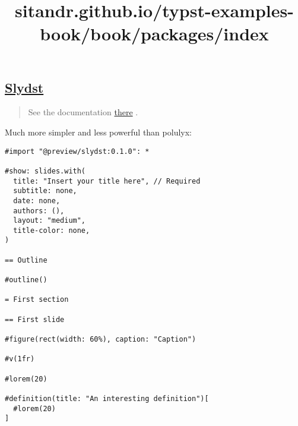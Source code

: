 \pandocbounded{}

\pandocbounded{}

\subsection{\texorpdfstring{\hyperref[slydst]{Slydst}}{Slydst}}\label{slydst}

\begin{quote}
See the documentation
\href{https://github.com/glambrechts/slydst?ysclid=lr2gszrkck541184604}{there}
.
\end{quote}

Much more simpler and less powerful than polulyx:

\begin{verbatim}
#import "@preview/slydst:0.1.0": *

#show: slides.with(
  title: "Insert your title here", // Required
  subtitle: none,
  date: none,
  authors: (),
  layout: "medium",
  title-color: none,
)

== Outline

#outline()

= First section

== First slide

#figure(rect(width: 60%), caption: "Caption")

#v(1fr)

#lorem(20)

#definition(title: "An interesting definition")[
  #lorem(20)
]
\end{verbatim}

\pandocbounded{}

\pandocbounded{}

\pandocbounded{}

\pandocbounded{}


\title{sitandr.github.io/typst-examples-book/book/packages/index}

